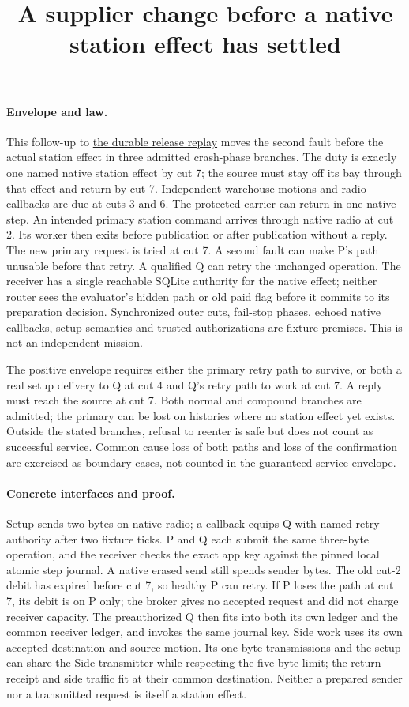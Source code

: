 \documentclass{article}
\title{A supplier change before a native station effect has settled}
\begin{document}
\maketitle

\paragraph{Envelope and law.}
This follow-up to
\href{https://github.com/eternal-november/eos-research-programmes/pull/634}{the durable release replay}
moves the second fault before the actual station effect in three admitted
crash-phase branches. The duty is exactly one named native station effect
by cut 7; the source must stay off its bay through that effect and return
by cut 7. Independent warehouse motions and radio callbacks are due at
cuts 3 and 6. The protected carrier can return in one native step.
An intended primary station command arrives through native radio at
cut 2. Its worker then exits before publication or after publication
without a reply. The new primary request is tried at cut 7. A second
fault can make P's path unusable before that retry. A qualified Q can
retry the unchanged operation. The receiver has a single reachable
SQLite authority for the native effect; neither router sees the
evaluator's hidden path or old paid flag before it commits to its
preparation decision. Synchronized outer cuts, fail-stop phases,
echoed native callbacks, setup semantics and trusted authorizations are
fixture premises. This is not an independent mission.

The positive envelope requires either the primary retry path to survive,
or both a real setup delivery to Q at cut 4 and Q's retry path to work
at cut 7. A reply must reach the source at cut 7. Both normal and
compound branches are admitted; the primary can be lost on histories
where no station effect yet exists. Outside the stated branches, refusal
to reenter is safe but does not count as successful service. Common
cause loss of both paths and loss of the confirmation are exercised as
boundary cases, not counted in the guaranteed service envelope.

\paragraph{Concrete interfaces and proof.}
Setup sends two bytes on native radio; a callback equips Q with named
retry authority after two fixture ticks. P and Q each submit the same
three-byte operation, and the receiver checks the exact app key against
the pinned local atomic step journal. A native erased send still spends
sender bytes. The old cut-2 debit has expired before cut 7, so healthy P
can retry. If P loses the path at cut 7, its debit is on P only;
the broker gives no accepted request and did not charge receiver capacity.
The preauthorized Q then fits into both its own ledger and the common
receiver ledger, and invokes the same journal key. Side work uses its
own accepted destination and source motion. Its one-byte transmissions
and the setup can share the Side transmitter while respecting the
five-byte limit; the return receipt and side traffic fit at their
common destination. Neither a prepared sender nor a transmitted request
is itself a station effect.
\end{document}
